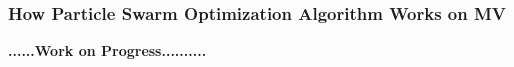\subsubsection{How Particle Swarm Optimization Algorithm Works on MV}


\textbf{......\textbf{Work on Progress}..........}       
 
